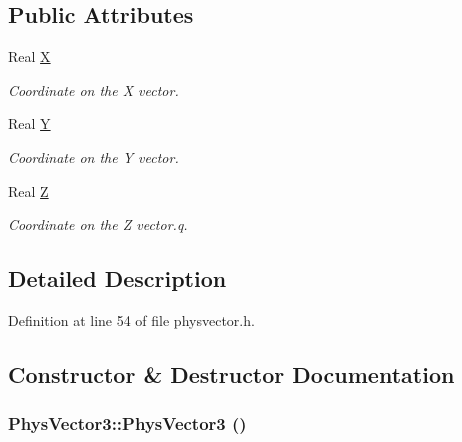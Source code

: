 \subsection*{Public Attributes}
\begin{DoxyCompactItemize}
\item 
\hypertarget{classPhysVector3_a8fb29119f25c996da9d091fd6ce5693f}{
Real \hyperlink{classPhysVector3_a8fb29119f25c996da9d091fd6ce5693f}{X}}
\label{da/d11/classPhysVector3_a8fb29119f25c996da9d091fd6ce5693f}

\begin{DoxyCompactList}\small\item\em Coordinate on the X vector. \item\end{DoxyCompactList}\item 
\hypertarget{classPhysVector3_a45b7fdd4361f9e31b36eab4551c1e558}{
Real \hyperlink{classPhysVector3_a45b7fdd4361f9e31b36eab4551c1e558}{Y}}
\label{da/d11/classPhysVector3_a45b7fdd4361f9e31b36eab4551c1e558}

\begin{DoxyCompactList}\small\item\em Coordinate on the Y vector. \item\end{DoxyCompactList}\item 
\hypertarget{classPhysVector3_a728c752b813e3191231904f629050a74}{
Real \hyperlink{classPhysVector3_a728c752b813e3191231904f629050a74}{Z}}
\label{da/d11/classPhysVector3_a728c752b813e3191231904f629050a74}

\begin{DoxyCompactList}\small\item\em Coordinate on the Z vector.q. \item\end{DoxyCompactList}\end{DoxyCompactItemize}


\subsection{Detailed Description}


Definition at line 54 of file physvector.h.



\subsection{Constructor \& Destructor Documentation}
\hypertarget{classPhysVector3_a0d68895a6479ed7f875f666ce381afba}{
\subsubsection[{PhysVector3}]{\setlength{\rightskip}{0pt plus 5cm}PhysVector3::PhysVector3 ()}}
\label{da/d11/classPhysVector3_a0d68895a6479ed7f875f666ce381afba}


